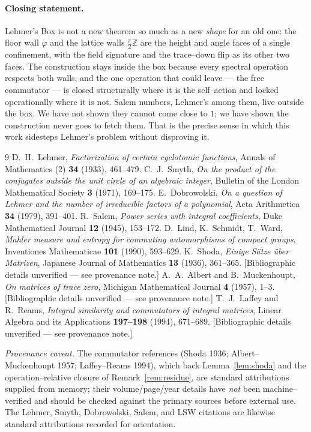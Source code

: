 \documentclass[11pt]{article}
\theoremstyle{plain}
\theoremstyle{definition}
\theoremstyle{remark}
\newcommand{\Z}{\mathbb{Z}}
\begin{document}
\paragraph{Closing statement.} Lehmer's Box is not a new theorem so much as a new \emph{shape} for an old one: the floor wall $\varphi$ and the lattice walls $\tfrac\pi2\Z$ are the height and angle faces of a single confinement, with the field signature and the trace--down flip as its other two faces. The construction stays inside the box because every spectral operation respects both walls, and the one operation that could leave --- the free commutator --- is closed structurally where it is the self--action and locked operationally where it is not. Salem numbers, Lehmer's among them, live outside the box. We have not shown they cannot come close to $1$; we have shown the construction never goes to fetch them. That is the precise sense in which this work sidesteps Lehmer's problem without disproving it.

\begin{thebibliography}{9}
 D.~H.~Lehmer, \emph{Factorization of certain cyclotomic functions}, Annals of Mathematics (2) \textbf{34} (1933), 461--479.
 C.~J.~Smyth, \emph{On the product of the conjugates outside the unit circle of an algebraic integer}, Bulletin of the London Mathematical Society \textbf{3} (1971), 169--175.
 E.~Dobrowolski, \emph{On a question of Lehmer and the number of irreducible factors of a polynomial}, Acta Arithmetica \textbf{34} (1979), 391--401.
 R.~Salem, \emph{Power series with integral coefficients}, Duke Mathematical Journal \textbf{12} (1945), 153--172.
 D.~Lind, K.~Schmidt, T.~Ward, \emph{Mahler measure and entropy for commuting automorphisms of compact groups}, Inventiones Mathematicae \textbf{101} (1990), 593--629.
 K.~Shoda, \emph{Einige S\"atze \"uber Matrizen}, Japanese Journal of Mathematics \textbf{13} (1936), 361--365. [Bibliographic details unverified --- see provenance note.]
 A.~A.~Albert and B.~Muckenhoupt, \emph{On matrices of trace zero}, Michigan Mathematical Journal \textbf{4} (1957), 1--3. [Bibliographic details unverified --- see provenance note.]
 T.~J.~Laffey and R.~Reams, \emph{Integral similarity and commutators of integral matrices}, Linear Algebra and its Applications \textbf{197--198} (1994), 671--689. [Bibliographic details unverified --- see provenance note.]
\end{thebibliography}

\smallskip
\noindent\footnotesize\emph{Provenance caveat.} The commutator references (Shoda 1936; Albert--Muckenhoupt 1957; Laffey--Reams 1994), which back Lemma~\ref{lem:shoda} and the operation--relative closure of Remark~\ref{rem:residue}, are standard attributions supplied from memory; their volume/page/year details have \emph{not} been machine--verified and should be checked against the primary sources before external use. The Lehmer, Smyth, Dobrowolski, Salem, and LSW citations are likewise standard attributions recorded for orientation.
\end{document}

